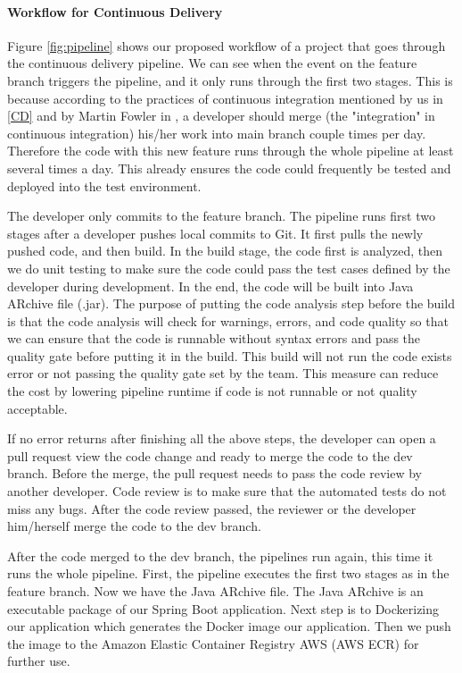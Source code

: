 \paragraph[]{Workflow for Continuous Delivery}
\label{workflow}
Figure \ref{fig:pipeline} shows our proposed workflow of a project that goes through the continuous delivery pipeline.
We can see when the event on the feature branch triggers the pipeline, and it only runs through the first two stages. This is because according to the practices of continuous integration mentioned by us in \ref{CD} and by Martin Fowler in \cite{fowler2006continuous}, a developer should merge (the "integration" in continuous integration) his/her work into main branch couple times per day. Therefore the code with this new feature runs through the whole pipeline at least several times a day. This already ensures the code could frequently be tested and deployed into the test environment.
\par
The developer only commits to the feature branch. The pipeline runs first two stages after a developer pushes local commits to Git. It first pulls the newly pushed code, and then build. In the build stage, the code first is analyzed, then we do unit testing to make sure the code could pass the test cases defined by the developer during development. In the end, the code will be built into Java ARchive file (.jar). The purpose of putting the code analysis step before the build is that the code analysis will check for warnings, errors, and code quality so that we can ensure that the code is runnable without syntax errors and pass the quality gate before putting it in the build. This build will not run the code exists error or not passing the quality gate set by the team. This measure can reduce the cost by lowering pipeline runtime if code is not runnable or not quality acceptable. 
\par
If no error returns after finishing all the above steps, the developer can open a pull request view the code change and ready to merge the code to the dev branch. Before the merge, the pull request needs to pass the code review by another developer. Code review is to make sure that the automated tests do not miss any bugs. After the code review passed, the reviewer or the developer him/herself merge the code to the dev branch.  
\par
After the code merged to the dev branch, the pipelines run again, this time it runs the whole pipeline. First, the pipeline executes the first two stages as in the feature branch. Now we have the Java ARchive file. The Java ARchive is an executable package of our Spring Boot application. Next step is to Dockerizing our application which generates the Docker image our application. Then we push the image to the Amazon Elastic Container Registry AWS (AWS ECR) for further use.
